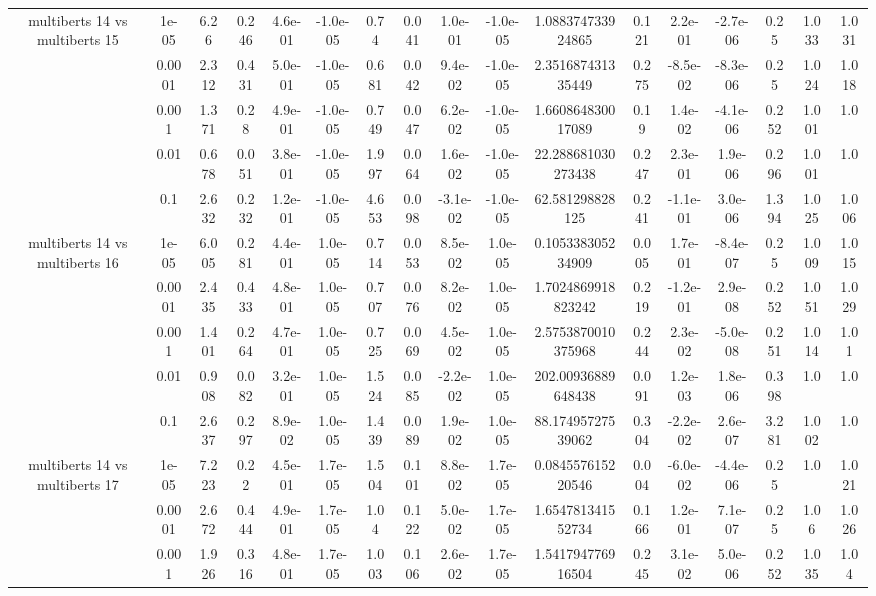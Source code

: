 \begin{tabular}{|c|c|c|c|c|c|c|c|c|c|c|c|c|c|c|c|c|}
\hline
\multirow{5}{*}{multiberts 14 vs multiberts 15} & 1e-05 & 6.26 & 0.246 & 4.6e-01 & -1.0e-05 & 0.74 & 0.041 & 1.0e-01 & -1.0e-05 & 1.088374733924865 & 0.121 & 2.2e-01 & -2.7e-06 & 0.25 & 1.033 & 1.031 \\
 & 0.0001 & 2.312 & 0.431 & 5.0e-01 & -1.0e-05 & 0.681 & 0.042 & 9.4e-02 & -1.0e-05 & 2.351687431335449 & 0.275 & -8.5e-02 & -8.3e-06 & 0.25 & 1.024 & 1.018 \\
 & 0.001 & 1.371 & 0.28 & 4.9e-01 & -1.0e-05 & 0.749 & 0.047 & 6.2e-02 & -1.0e-05 & 1.660864830017089 & 0.19 & 1.4e-02 & -4.1e-06 & 0.252 & 1.001 & 1.0 \\
 & 0.01 & 0.678 & 0.051 & 3.8e-01 & -1.0e-05 & 1.997 & 0.064 & 1.6e-02 & -1.0e-05 & 22.288681030273438 & 0.247 & 2.3e-01 & 1.9e-06 & 0.296 & 1.001 & 1.0 \\
 & 0.1 & 2.632 & 0.232 & 1.2e-01 & -1.0e-05 & 4.653 & 0.098 & -3.1e-02 & -1.0e-05 & 62.581298828125 & 0.241 & -1.1e-01 & 3.0e-06 & 1.394 & 1.025 & 1.006 \\
\hline
\multirow{5}{*}{multiberts 14 vs multiberts 16} & 1e-05 & 6.005 & 0.281 & 4.4e-01 & 1.0e-05 & 0.714 & 0.053 & 8.5e-02 & 1.0e-05 & 0.105338305234909 & 0.005 & 1.7e-01 & -8.4e-07 & 0.25 & 1.009 & 1.015 \\
 & 0.0001 & 2.435 & 0.433 & 4.8e-01 & 1.0e-05 & 0.707 & 0.076 & 8.2e-02 & 1.0e-05 & 1.7024869918823242 & 0.219 & -1.2e-01 & 2.9e-08 & 0.252 & 1.051 & 1.029 \\
 & 0.001 & 1.401 & 0.264 & 4.7e-01 & 1.0e-05 & 0.725 & 0.069 & 4.5e-02 & 1.0e-05 & 2.5753870010375968 & 0.244 & 2.3e-02 & -5.0e-08 & 0.251 & 1.014 & 1.01 \\
 & 0.01 & 0.908 & 0.082 & 3.2e-01 & 1.0e-05 & 1.524 & 0.085 & -2.2e-02 & 1.0e-05 & 202.00936889648438 & 0.091 & 1.2e-03 & 1.8e-06 & 0.398 & 1.0 & 1.0 \\
 & 0.1 & 2.637 & 0.297 & 8.9e-02 & 1.0e-05 & 1.439 & 0.089 & 1.9e-02 & 1.0e-05 & 88.17495727539062 & 0.304 & -2.2e-02 & 2.6e-07 & 3.281 & 1.002 & 1.0 \\
\hline
\multirow{5}{*}{multiberts 14 vs multiberts 17} & 1e-05 & 7.223 & 0.22 & 4.5e-01 & 1.7e-05 & 1.504 & 0.101 & 8.8e-02 & 1.7e-05 & 0.084557615220546 & 0.004 & -6.0e-02 & -4.4e-06 & 0.25 & 1.0 & 1.021 \\
 & 0.0001 & 2.672 & 0.444 & 4.9e-01 & 1.7e-05 & 1.04 & 0.122 & 5.0e-02 & 1.7e-05 & 1.654781341552734 & 0.166 & 1.2e-01 & 7.1e-07 & 0.25 & 1.06 & 1.026 \\
 & 0.001 & 1.926 & 0.316 & 4.8e-01 & 1.7e-05 & 1.003 & 0.106 & 2.6e-02 & 1.7e-05 & 1.541794776916504 & 0.245 & 3.1e-02 & 5.0e-06 & 0.252 & 1.035 & 1.04 \\

\end{tabular}
